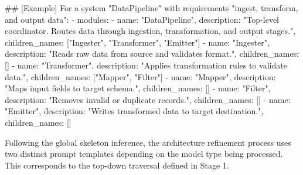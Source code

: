 \begin{promptbox}
## [Example]
For a system "DataPipeline" with requirements "ingest, transform, and output data":
- modules:
  - name: "DataPipeline", description: "Top-level coordinator. Routes data through ingestion, transformation, and output stages.", children_names: ["Ingester", "Transformer", "Emitter"]
  - name: "Ingester", description: "Reads raw data from source and validates format.", children_names: []
  - name: "Transformer", description: "Applies transformation rules to validate data.", children_names: ["Mapper", "Filter"]
  - name: "Mapper", description: "Maps input fields to target schema.", children_names: []
  - name: "Filter", description: "Removes invalid or duplicate records.", children_names: []
  - name: "Emitter", description: "Writes transformed data to target destination.", children_names: []
\end{promptbox}

Following the global skeleton inference, the architecture refinement process uses two distinct prompt templates depending on the model type being processed. This corresponds to the top-down traversal defined in Stage 1. 

